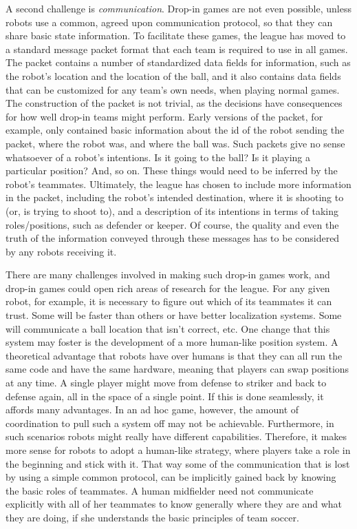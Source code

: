 \documentclass{llncs}
\begin{document}
A second challenge is \textit{communication}. Drop-in games are not even possible,
unless robots use a common, agreed upon communication
protocol, so that they can share basic state information.  To facilitate these
games, the league has moved to a standard message packet format that each team
is required to use in all games. The packet contains a number of standardized data fields
for information, such as the robot's location and the location of the ball, and it
also contains data fields that can be customized for any team's own needs, when
playing normal games. The construction of the packet is not trivial, as
the decisions have consequences for how well drop-in teams might perform.
Early versions of the packet, for example, only contained basic information
about the id of the robot sending the packet, where the robot was, and where the ball was. Such packets give no
sense whatsoever of a robot's intentions. Is it going to the ball? Is it playing
a particular position? And, so on. These things would need to be inferred by the
robot's teammates. Ultimately, the league has chosen to include more information
in the packet, including the robot's intended destination, where it is shooting
to (or, is trying to shoot to), and a description of its intentions in terms of taking roles/positions, such
as defender or keeper. Of course, the quality and even the truth of the
information conveyed through these messages has to be considered by any robots receiving it.

There are many challenges involved in making such drop-in games work, and drop-in games
could open rich areas of research for the league.
For any given robot, for example, it is necessary to figure out which
of its teammates it can trust. Some will be faster than others or have
better localization systems. Some will communicate a ball location
that isn't correct, etc. One change that this system may foster is
the development of a more human-like position system. A theoretical advantage that robots
have over humans is that they can all run the same code and have
the same hardware, meaning that players can swap positions at any
time. A single player might move from defense to striker and back to
defense again, all in the space of a single point. If this is done seamlessly,
it affords many advantages. In an ad hoc game, however, the amount of
coordination to pull such a system off may not be achievable. 
Furthermore, in such scenarios robots might really have different capabilities.
Therefore, it makes
more sense for robots to adopt a human-like strategy, where
players take a role in the beginning and stick with it. That way some of the
communication that is lost by using a simple common protocol, can
be implicitly gained back by knowing the basic roles of teammates.
A human midfielder need not communicate explicitly with all of her
teammates to know generally where they are and what they are doing,
if she understands the basic principles of team soccer.
\end{document}
